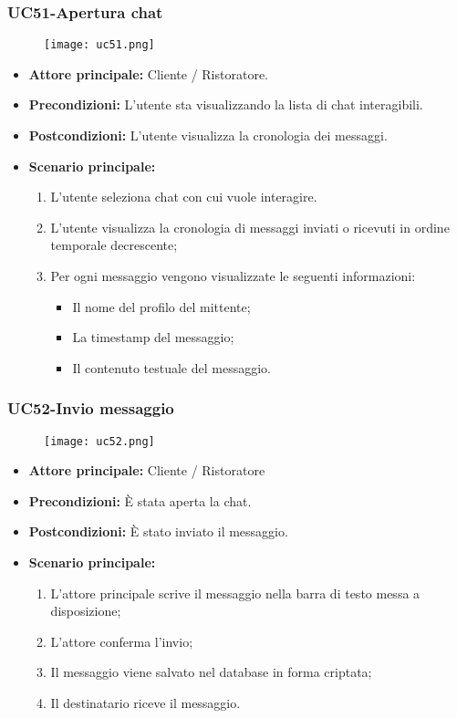 \pagebreak

\subsubsection{UC51-Apertura chat}
\begin{figure}[h] \texttt{[image: uc51.png]} \end{figure}
\begin{itemize}
\item \textbf{Attore principale:} Cliente / Ristoratore.
\item \textbf{Precondizioni:} L'utente sta visualizzando la lista di chat interagibili.
\item \textbf{Postcondizioni:} L'utente visualizza la cronologia dei messaggi.
\item \textbf{Scenario principale:}
\begin{enumerate}
    \item L'utente seleziona chat con cui vuole interagire.
    \item L'utente visualizza la cronologia di messaggi inviati o ricevuti in ordine temporale decrescente;
    \item Per ogni messaggio vengono visualizzate le seguenti informazioni:
      \begin{itemize}
        \item Il nome del profilo del mittente;
        \item La timestamp del messaggio;
        \item Il contenuto testuale del messaggio.
      \end{itemize}
\end{enumerate}
\end{itemize}

\subsubsection{UC52-Invio messaggio}
\begin{figure}[h] \texttt{[image: uc52.png]} \end{figure}
\begin{itemize}
\item \textbf{Attore principale:} Cliente / Ristoratore
\item \textbf{Precondizioni:} È stata aperta la chat.
\item \textbf{Postcondizioni:} È stato inviato il messaggio.
\item \textbf{Scenario principale:}
\begin{enumerate}
    \item L'attore principale scrive il messaggio nella barra di testo messa a disposizione;
    \item L'attore conferma l'invio;
    \item Il messaggio viene salvato nel database in forma criptata;
    \item Il destinatario riceve il messaggio.
\end{enumerate}
\end{itemize}
